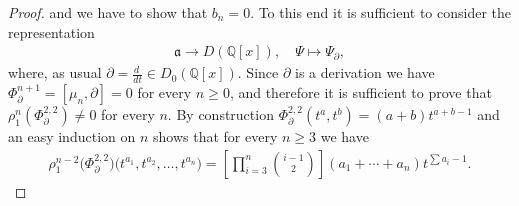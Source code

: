 \documentclass[11pt]{article}
\newcommand{\de}{\partial}
\newcommand{\Q}{\mathbb{Q}}
\numberwithin{equation}{section}
\begin{document}
\begin{proof}
and we have to show that $b_n=0$. To this end it is suf\/f\/icient to consider the representation
\begin{gather*} \mathfrak{a}\to D(\Q[x]),\quad \Psi\mapsto \Psi_\de,\end{gather*}
where, as usual $\de=\frac{d~}{dt}\in D_0(\Q[x])$. Since $\de$ is a derivation we have
$\Phi^{n+1}_\de=[\mu_n,\de]=0$ for every $n\ge 0$, and therefore it is suf\/f\/icient to prove that $\rho_1^{n}(\Phi^{2,2}_\de)\not=0$ for every $n$.
By construction $\Phi^{2,2}_\de(t^a,t^b)=(a+b)t^{a+b-1}$ and an easy induction on $n$ shows that for every $n\ge 3$ we have
\begin{gather*} \rho_1^{n-2}\big(\Phi^{2,2}_\de\big)\big(t^{a_1},t^{a_2},\ldots,t^{a_n}\big)=
\left[\prod_{i=3}^n\binom{i-1}{2}\right](a_1+\cdots+a_n)t^{\sum a_i-1}.\tag*{\qed}\end{gather*}
\renewcommand{\qed}{}
\end{proof}
\end{document}
